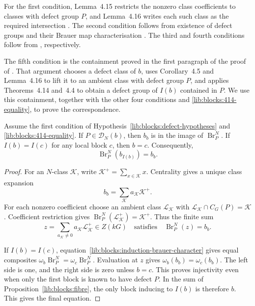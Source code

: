 For the first condition, Lemma~4.15 restricts the nonzero class
coefficients to classes with defect group $P$, and Lemma~4.16 writes
each such class as the required intersection
\cite[pp.~88--89]{Navarro1998}. The second condition follows from
existence of defect groups and their Brauer map characterisation
\cite[Theorems~4.3 and~4.11]{Navarro1998}.
The third and fourth conditions follow from
\cite[Theorem~4.8 and Lemma~4.13]{Navarro1998},
respectively.

The fifth condition is the containment proved in the first paragraph
of the proof of \cite[Theorem~4.17]{Navarro1998}. That argument
chooses a defect class of $b$, uses Corollary~4.5 and Lemma~4.16 to
lift it to an ambient class with defect group $P$, and applies
Theorems~4.14 and~4.4 to obtain a defect group of $I(b)$ contained in
$P$. We use this containment, together with the other four conditions
and \eqref{lib:blocks:414-equality}, to prove the correspondence.

\begin{proposition}
\label{lib:blocks:class-lift}
Assume the first condition of
Hypothesis~\ref{lib:blocks:defect-hypotheses} and
\eqref{lib:blocks:414-equality}. If $P\in\mathcal D_N(b)$, then
$b_b$ is in the image of $\operatorname{Br}_P^N$.
If $I(b)=I(c)$ for any local block $c$, then $b=c$. Consequently,
\[
 \operatorname{Br}_P^N(b_{I(b)})=b_b.
\]
\end{proposition}
\begin{proof}
For an $N$-class $\mathcal K$, write
$\mathcal K^+=\sum_{x\in\mathcal K}x$. Centrality gives a unique
class expansion
\[
 b_b=\sum_{\mathcal K}a_{\mathcal K}\mathcal K^+.
\]
For each nonzero coefficient choose an ambient class
$\mathcal L_{\mathcal K}$ with
$\mathcal L_{\mathcal K}\cap C_G(P)=\mathcal K$.
Coefficient restriction gives
$\operatorname{Br}_P^N(\mathcal L_{\mathcal K}^+)=\mathcal K^+$.
Thus the finite sum
\[
 z=\sum_{a_{\mathcal K}\ne0}
       a_{\mathcal K}\mathcal L_{\mathcal K}^+\in Z(kG)
 \quad\text{satisfies}\quad \operatorname{Br}_P^N(z)=b_b.
\]

If $I(b)=I(c)$, equation~\eqref{lib:blocks:induction-brauer-character}
gives equal composites
$\omega_b\operatorname{Br}_P^N=\omega_c\operatorname{Br}_P^N$.
Evaluation at $z$ gives $\omega_b(b_b)=\omega_c(b_b)$. The left side
is one, and the right side is zero unless $b=c$. This proves
injectivity even when only the first block is known to have defect
$P$. In the sum of Proposition~\ref{lib:blocks:fibre}, the only block
inducing to $I(b)$ is therefore $b$. This gives the final equation.
\end{proof}

